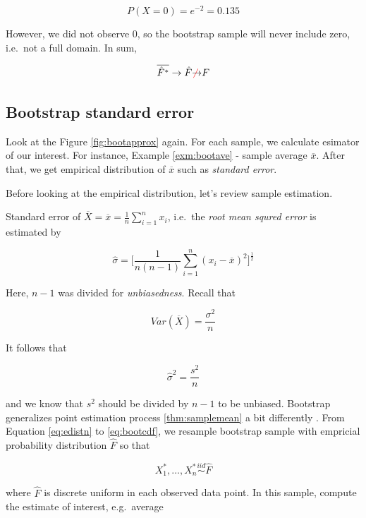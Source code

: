 \documentclass[]{book}
\theoremstyle{definition}
\theoremstyle{definition}
\theoremstyle{definition}
\theoremstyle{remark}
\let\BeginKnitrBlock\begin \let\EndKnitrBlock\end
\begin{document}
\[P(X = 0) = e^{-2} = 0.135\]

However, we did not observe \(0\), so the bootstrap sample will never include zero, i.e.~not a full domain. In sum,

\[\overline{\hat{F}^{\ast}} \rightarrow \hat{F} {\color{red}{\not}}{\rightarrow} F\]

\hypertarget{bootstrap-standard-error}{%
\subsection{Bootstrap standard error}\label{bootstrap-standard-error}}

Look at the Figure \ref{fig:bootapprox} again. For each sample, we calculate esimator of our interest. For instance, Example \ref{exm:bootave} - sample average \(\overline{x}\). After that, we get empirical distribution of \(\overline{x}\) such as \emph{standard error}.

Before looking at the empirical distribution, let's review sample estimation.

\BeginKnitrBlock{theorem}[Standard error of sample mean]
\protect\hypertarget{thm:samplemean}{}{\label{thm:samplemean} {} }Standard error of \(\overline{X} = \overline{x} = \frac{1}{n} \displaystyle\sum_{i = 1}^n x_i\), i.e.~the \textit{root mean squred error} is estimated by

\[\hat\sigma = \bigg[ \frac{1}{n (n - 1)} \sum_{i = 1}^n (x_i - \overline{x})^2 \bigg]^{\frac{1}{2}}\]
\EndKnitrBlock{theorem}

Here, \(n - 1\) was divided for \emph{unbiasedness}. Recall that

\[Var(\overline{X}) = \frac{\sigma^2}{n}\]

It follows that

\[\hat\sigma^2 = \frac{s^2}{n}\]

and we know that \(s^2\) should be divided by \(n - 1\) to be unbiased. Bootstrap generalizes point estimation process \ref{thm:samplemean} a bit differently \citep{Efron:1983bw}. From Equation \eqref{eq:edistn} to \eqref{eq:bootcdf}, we resample bootstrap sample with empricial probability distribution \(\hat{F}\) so that

\begin{equation}
  X_1^{\ast}, \ldots, X_n^{\ast} \stackrel{iid}{\sim}\hat{F}
  \label{eq:samplescheme}
\end{equation}

where \(\hat{F}\) is discrete uniform in each observed data point. In this sample, compute the estimate of interest, e.g.~average
\end{document}
